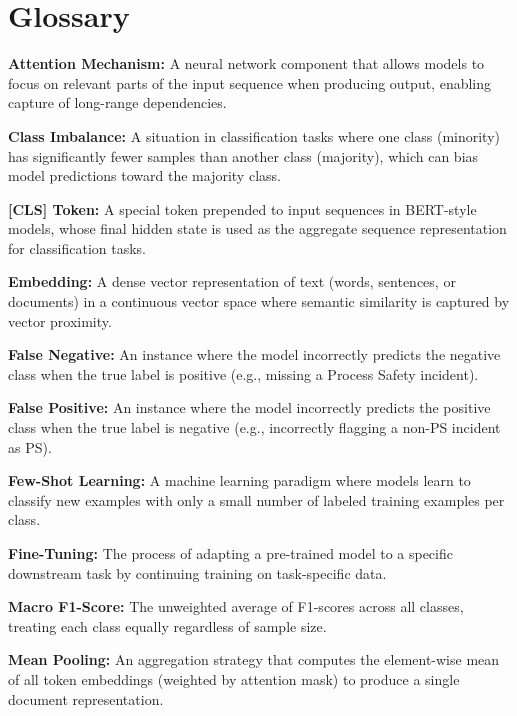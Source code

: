 \documentclass[11pt, titlepage, bibliography=totoc]{scrreprt}
\begin{document}
\cleardoublepage

\chapter*{Glossary}

\textbf{Attention Mechanism:} A neural network component that allows models to focus on relevant parts of the input sequence when producing output, enabling capture of long-range dependencies.

\textbf{Class Imbalance:} A situation in classification tasks where one class (minority) has significantly fewer samples than another class (majority), which can bias model predictions toward the majority class.

\textbf{[CLS] Token:} A special token prepended to input sequences in BERT-style models, whose final hidden state is used as the aggregate sequence representation for classification tasks.

\textbf{Embedding:} A dense vector representation of text (words, sentences, or documents) in a continuous vector space where semantic similarity is captured by vector proximity.

\textbf{False Negative:} An instance where the model incorrectly predicts the negative class when the true label is positive (e.g., missing a Process Safety incident).

\textbf{False Positive:} An instance where the model incorrectly predicts the positive class when the true label is negative (e.g., incorrectly flagging a non-PS incident as PS).

\textbf{Few-Shot Learning:} A machine learning paradigm where models learn to classify new examples with only a small number of labeled training examples per class.

\textbf{Fine-Tuning:} The process of adapting a pre-trained model to a specific downstream task by continuing training on task-specific data.

\textbf{Macro F1-Score:} The unweighted average of F1-scores across all classes, treating each class equally regardless of sample size.

\textbf{Mean Pooling:} An aggregation strategy that computes the element-wise mean of all token embeddings (weighted by attention mask) to produce a single document representation.
\end{document}
